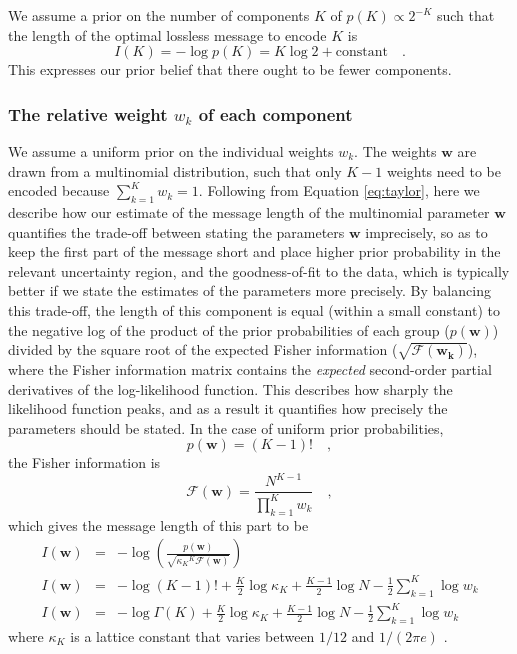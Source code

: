\documentclass{elsarticle}
\newcommand{\vect}[1]{\boldsymbol{\mathbf{#1}}}
\renewcommand{\vec}[1]{\vect{#1}}
\def\weight{w}
\def\weights{\vect{\weight}}
\newcommand{\fisher}[1]{\mathcal{F}\left(#1\right)}
\newcommand{\prior}[1]{p\left(#1\right)}
\begin{document}
We assume a prior on the number of components $K$ of $\prior{K} \propto 2^{-K}$
\cite[][p279, sec. 6.8.2]{Wallace05} such that the length of the 
optimal lossless message to encode $K$ is 
\begin{equation}
    I(K) = -\log{\prior{K}} = K\log{2} + \textrm{constant} \quad .
\end{equation}
This  expresses our prior belief that there ought to be fewer components.



\subsubsection{The relative weight $w_k$ of each component}

We assume a uniform prior on the individual weights $\weight_{k}$. The weights
$\weights$ are drawn from a multinomial distribution, such that only $K - 1$
weights need to be encoded because $\sum_{k=1}^{K}\weight_k = 1$. Following
from Equation \ref{eq:taylor}, here we describe how our estimate of the message 
length of the multinomial parameter $\vec{\weight}$ quantifies the trade-off 
between stating the parameters $\vec{\weights}$ imprecisely, so as to keep the 
first part of the message short and place higher prior probability in the 
relevant uncertainty region, and the goodness-of-fit to the data, which is 
typically better if we state the estimates of the parameters more precisely. 
By balancing this trade-off, the length of this component is equal (within a 
small constant) to the negative log of the product of the prior probabilities 
of each group ($\prior{\vec{\weight}}$) divided by the square root of the 
expected Fisher information ($\sqrt{\fisher{\vec{\weight_k}}}$), where the 
Fisher information matrix contains the \emph{expected} second-order partial 
derivatives of the log-likelihood function. This describes how sharply the 
likelihood function peaks, and as a result it quantifies how precisely the 
parameters should be stated. In the case of uniform prior probabilities,
\begin{equation}
    \prior{\vec{\weight}} = (K - 1)! \quad ,
\end{equation}
\noindent{}the Fisher information is
\begin{equation}
\fisher{\vec{w}} = \frac{N^{K - 1}}{\prod_{k=1}^{K} w_k} \quad ,
\end{equation}
\noindent{}which gives the message length of this part to be
\begin{eqnarray}
I(\vec{w}) &=& -\log\left(\frac{\prior{\vec{w}}}{\sqrt{{\kappa_K}^K \fisher{\vec{w}}}}\right)  \nonumber \\
I(\vec{w}) &=& -\log{(K - 1)!} + \frac{K}{2}\log{\kappa_K} + \frac{K-1}{2}\log{N} - \frac{1}{2}\sum_{k=1}^{K}\log{\weight_k} \nonumber \\
I(\vec{w}) &=& -\log{\Gamma(K)} + \frac{K}{2}\log{\kappa_K} + \frac{K-1}{2}\log{N} - \frac{1}{2}\sum_{k=1}^{K}\log{\weight_k}
\end{eqnarray}
\noindent{}where $\kappa_K$ is a lattice constant that varies between $1/12$
and $1/(2\pi e)$ \cite{BoultonWallace1969}.
\end{document}
